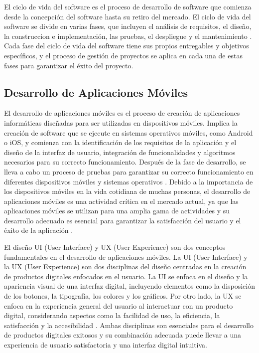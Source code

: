 \documentclass[runningheads]{llncs}
\begin{document}
El ciclo de vida del software es el proceso de desarrollo de software que comienza desde la concepción del software hasta su retiro del mercado. El ciclo de vida del software se divide en varias fases, que incluyen el análisis de requisitos, el diseño, la construccion e implementación, las pruebas, el despliegue y el mantenimiento \cite{Cita3}. Cada fase del ciclo de vida del software tiene sus propios entregables y objetivos específicos, y el proceso de gestión de proyectos se aplica en cada una de estas fases para garantizar el éxito del proyecto.

\subsection{Desarrollo de Aplicaciones Móviles}
El desarrollo de aplicaciones móviles es el proceso de creación de aplicaciones informáticas diseñadas para ser utilizadas en dispositivos móviles. Implica la creación de software que se ejecute en sistemas operativos móviles, como Android o iOS, y comienza con la identificación de los requisitos de la aplicación y el diseño de la interfaz de usuario, integración de funcionalidades y algoritmos necesarios para su correcto funcionamiento. Después de la fase de desarrollo, se lleva a cabo un proceso de pruebas para garantizar su correcto funcionamiento en diferentes dispositivos móviles y sistemas operativos \cite{Cita4}.
Debido a la importancia de los dispositivos móviles en la vida cotidiana de muchas personas, el desarrollo de aplicaciones móviles es una actividad crítica en el mercado actual, ya que las aplicaciones móviles se utilizan para una amplia gama de actividades y su desarrollo adecuado es esencial para garantizar la satisfacción del usuario y el éxito de la aplicación \cite{Cita5}.


El diseño UI (User Interface) y UX (User Experience) son dos conceptos fundamentales en el desarrollo de aplicaciones móviles. La UI (User Interface) y la UX (User Experience) son dos disciplinas del diseño centradas en la creación de productos digitales enfocados en el usuario. La UI se enfoca en el diseño y la apariencia visual de una interfaz digital, incluyendo elementos como la disposición de los botones, la tipografía, los colores y los gráficos. Por otro lado, la UX se enfoca en la experiencia general del usuario al interactuar con un producto digital, considerando aspectos como la facilidad de uso, la eficiencia, la satisfacción y la accesibilidad \cite{Cita6}. Ambas disciplinas son esenciales para el desarrollo de productos digitales exitosos y su combinación adecuada puede llevar a una experiencia de usuario satisfactoria y una interfaz digital intuitiva. 
\end{document}
